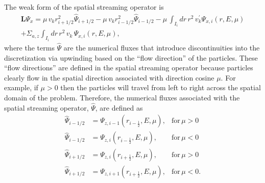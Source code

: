 The weak form of the spatial streaming operator is 
\begin{multline} \label{eqn:spatial-weak-form}
    \boldsymbol{L} \Psi_x = \mu \, v_k r_{i+1/2}^2 \widehat{\Psi}_{i+1/2} - \mu \, v_k r_{i-1/2}^2 \widehat{\Psi}_{i-1/2} - \mu \, \int_{I_i} dr \, r^2 \, v_k^{\prime} \Psi_{x,i}(r,E,\mu) \\ 
    + \Sigma_{a,z} \int_{I_i} dr \, r^2 \, v_k \, \Psi_{x,i}(r,E,\mu),
\end{multline}
where the terms $\widehat{\Psi}$ are the numerical fluxes that introduce discontinuities into the discretization via upwinding based on the ``flow direction'' of the particles. These ``flow directions'' are defined in the spatial streaming operator because particles clearly flow in the spatial direction associated with direction cosine $\mu$. For example, if $\mu > 0$ then the particles will travel from left to right across the spatial domain of the problem. Therefore, the numerical fluxes associated with the spatial streaming operator, $\widehat{\Psi}$, are defined as
\begin{subequations} \label{eqn:spatial-upwinding}
    \begin{align}
        \widehat{\Psi}_{i-1/2} &= \Psi_{z,i-1}(r_{i-\frac{1}{2}},E,\mu),  &\text{for} \, \mu > 0 \\
        \widehat{\Psi}_{i-1/2} &= \Psi_{z,i}(r_{i-\frac{1}{2}},E,\mu),  &\text{for} \, \mu < 0 \\
        \widehat{\Psi}_{i+1/2} &= \Psi_{z,i}(r_{i+\frac{1}{2}},E,\mu),  &\text{for} \, \mu > 0 \\
        \widehat{\Psi}_{i+1/2} &= \Psi_{z,i+1}(r_{i+\frac{1}{2}},E,\mu),  &\text{for} \, \mu < 0.
    \end{align}
\end{subequations}